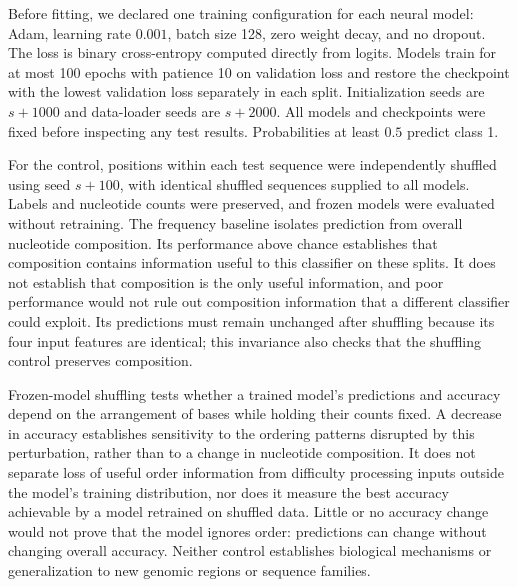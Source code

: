 \documentclass[12pt]{article}
\begin{document}
\begin{enumerate}
\begin{enumerate}[label=\textbf{\Alph*.}, leftmargin=*]
       Before fitting, we declared one training configuration for each
       neural model: Adam, learning rate $0.001$, batch size 128, zero
       weight decay, and no dropout. The loss is binary cross-entropy
       computed directly from logits. Models train for at most 100 epochs
       with patience 10 on validation loss and restore the checkpoint
       with the lowest validation loss separately in each split.
       Initialization seeds are $s+1000$ and data-loader seeds are $s+2000$.
       All models and checkpoints were fixed before inspecting any test
       results. Probabilities at least $0.5$ predict class 1.

       For the control, positions within each test sequence were
       independently shuffled using seed $s+100$, with identical shuffled
       sequences supplied to all models. Labels and nucleotide counts
       were preserved, and frozen models were evaluated without retraining.
       The frequency baseline isolates prediction from overall nucleotide
       composition. Its performance above chance establishes that
       composition contains information useful to this classifier on
       these splits. It does not establish that composition is the only
       useful information, and poor performance would not rule out
       composition information that a different classifier could exploit.
       Its predictions must remain unchanged after shuffling because its
       four input features are identical; this invariance also checks
       that the shuffling control preserves composition.

       Frozen-model shuffling tests whether a trained model's predictions
       and accuracy depend on the arrangement of bases while holding
       their counts fixed. A decrease in accuracy establishes sensitivity
       to the ordering patterns disrupted by this perturbation, rather
       than to a change in nucleotide composition. It does not separate
       loss of useful order information from difficulty processing inputs
       outside the model's training distribution, nor does it measure the
       best accuracy achievable by a model retrained on shuffled data.
       Little or no accuracy change would not prove that the model ignores
       order: predictions can change without changing overall accuracy.
       Neither control establishes biological mechanisms or generalization
       to new genomic regions or sequence families.


\end{enumerate}
\end{enumerate}
\end{document}
